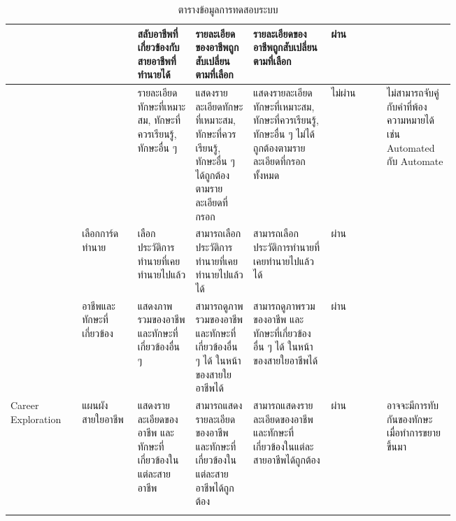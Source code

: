 \begin{longtable}{|>{\centering}p{0.1\linewidth}|p{0.1\linewidth}|p{0.1\linewidth}|p{0.1\linewidth}|p{0.14\linewidth}|>{\centering}p{0.1\linewidth}|p{0.1\linewidth}|}
                       &                                  & สลับอาชีพที่เกี่ยวข้องกับสายอาชีพที่ทำนายได้                   & รายละเอียดของอาชีพถูกสับเปลี่ยนตามที่เลือก                                           & รายละเอียดของอาชีพถูกสับเปลี่ยนตามที่เลือก                                                  & ผ่าน      &                                                        \\ \cline{3-7}
                       &                                  & รายละเอียดทักษะที่เหมาะสม, ทักษะที่ควรเรียนรู้, ทักษะอื่น ๆ    & แสดงรายละเอียดทักษะที่เหมาะสม, ทักษะที่ควรเรียนรู้, ทักษะอื่น ๆ ได้ถูกต้องตามรายละเอียดที่กรอก & แสดงรายละเอียดทักษะที่เหมาะสม, ทักษะที่ควรเรียนรู้, ทักษะอื่น ๆ ไม่ได้ถูกต้องตามรายละเอียดที่กรอกทั้งหมด & ไม่ผ่าน    & ไม่สามารถจับคู่กับคำที่พ้องความหมายได้ เช่น Automated กับ Automate \\
    \cline{2-7}
                       & เลือกการ์ดทำนาย                     & เลือกประวัติการทำนายที่เคยทำนายไปแล้ว                     & สามารถเลือกประวัติการทำนายที่เคยทำนายไปแล้วได้                                       & สามารถเลือกประวัติการทำนายที่เคยทำนายไปแล้วได้                                              & ผ่าน      &                                                        \\
    \cline{2-7}
                       & อาชีพและทักษะที่เกี่ยวข้อง              & แสดงภาพรวมของอาชีพ และทักษะที่เกี่ยวข้องอื่น ๆ             & สามารถดูภาพรวมของอาชีพ และทักษะที่เกี่ยวข้องอื่น ๆ ได้ ในหน้าของสายใยอาชีพได้             & สามารถดูภาพรวมของอาชีพ และทักษะที่เกี่ยวข้องอื่น ๆ ได้ ในหน้าของสายใยอาชีพได้                    & ผ่าน      &                                                        \\ \hline
    Career Exploration & แผนผังสายใยอาชีพ                   & แสดงรายละเอียดของอาชีพ และทักษะที่เกี่ยวข้องในแต่ละสายอาชีพ & สามารถแสดงรายละเอียดของอาชีพ และทักษะที่เกี่ยวข้องในแต่ละสายอาชีพได้ถูกต้อง              & สามารถแสดงรายละเอียดของอาชีพ และทักษะที่เกี่ยวข้องในแต่ละสายอาชีพได้ถูกต้อง                     & ผ่าน      & อาจจะมีการทับกันของทักษะ เมื่อทำการขยายขึ้นมา                   \\ \hline
    \caption{ตารางข้อมูลการทดสอบระบบ}
    \label{tbl:test-scenario}
\end{longtable}

